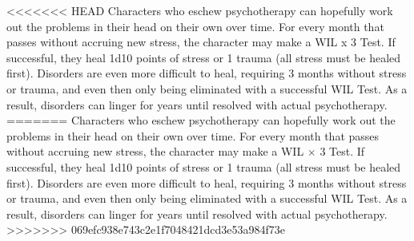 <<<<<<< HEAD
Characters who eschew psychotherapy can hopefully work out the problems in their head on their own over time. For every month that passes without accruing new stress, the character may make a WIL x 3 Test. If successful, they heal 1d10 points of stress or 1 trauma (all stress must be healed first). Disorders are even more difficult to heal, requiring 3 months without stress or trauma, and even then only being eliminated with a successful WIL Test. As a result, disorders can linger for years until resolved with actual psychotherapy.
=======
Characters who eschew psychotherapy can hopefully work out the problems in their head on their own over time. For every month that passes without accruing new stress, the character may make a WIL $\times$ 3 Test. If successful, they heal 1d10 points of stress or 1 trauma (all stress must be healed first). Disorders are even more difficult to heal, requiring 3 months without stress or trauma, and even then only being eliminated with a successful WIL Test. As a result, disorders can linger for years until resolved with actual psychotherapy.
>>>>>>> 069efc938e743c2e1f7048421dcd3e53a984f73e

